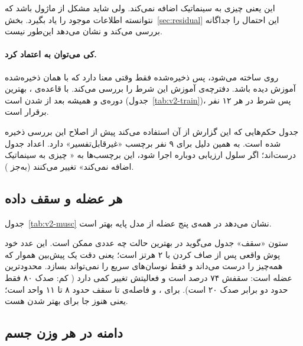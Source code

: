 این یعنی  چیزی به سینماتیک اضافه نمی‌کند. ولی شاید مشکل از ماژول  باشد که نتوانسته اطلاعات موجود را یاد بگیرد. بخش~\ref{sec:residual} این احتمال را جداگانه بررسی می‌کند و نشان می‌دهد این‌طور نیست.



\paragraph{کی می‌توان به  اعتماد کرد.}  روی  ساخته می‌شود، پس  ذخیره‌شده فقط وقتی معنا دارد که با همان  ذخیره‌شده آموزش دیده باشد. دفترچه‌ی آموزش این شرط را بررسی می‌کند. با قاعده‌ی ، بهترین دوره‌ی  و  همیشه بعد از  شدن  است (جدول~\ref{tab:v2-train})، پس شرط در هر ۱۲ نفر برقرار است.

جدول حکم‌هایی که این گزارش از آن استفاده می‌کند پیش از اصلاح این بررسی ذخیره شده است. به همین دلیل برای ۹ نفر برچسب «غیرقابل‌تفسیر» دارد. اعداد جدول درست‌اند؛ اگر سلول ارزیابی دوباره اجرا شود، این برچسب‌ها به « چیزی به سینماتیک اضافه نمی‌کند» تغییر می‌کنند (به‌جز ).




\subsection{هر عضله و سقف داده}

جدول~\ref{tab:v2-musc} نشان می‌دهد  در همه‌ی پنج عضله از مدل پایه بهتر است.

ستون «سقف» جدول می‌گوید در بهترین حالت چه عددی ممکن است. این عدد  خود پوش واقعی پس از صاف کردن با  ۲ هرتز است؛ یعنی دقت یک پیش‌بین هموار که همه‌چیز را درست می‌داند و فقط نوسان‌های سریع را نمی‌تواند بسازد.  محدودترین عضله است: سقفش ۷۴ درصد است و فعالیتش تغییر کمی دارد ( کم: صدک ۸۰ فقط حدود دو برابر صدک ۲۰ است). برای ،  و  فاصله‌ی  تا سقف حدود ۸ تا ۱۱ واحد است؛ یعنی هنوز جا برای بهتر شدن هست.



\subsection{دامنه در هر وزن جسم}

